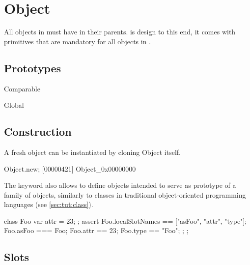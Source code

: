 
\section{Object}

All objects in \us must have  in their
parents.  is design to this end, it comes with primitives
that are mandatory for all objects in \us.

\subsection{Prototypes}

\begin{refObjects}
\item[Comparable]
\item[Global]
\end{refObjects}

\subsection{Construction}

A fresh object can be instantiated by cloning Object itself.

\begin{urbiscript}[firstnumber=1]
Object.new;
[00000421] Object_0x00000000
\end{urbiscript}

The keyword  also allows to define objects intended to serve
as prototype of a family of objects, similarly to classes in traditional
object-oriented programming languages (see \autoref{sec:tut:class}).

\begin{urbiscript}
{
  class Foo
  {
    var attr = 23;
  };
  assert
  {
    Foo.localSlotNames == ["asFoo", "attr", "type"];
    Foo.asFoo === Foo;
    Foo.attr == 23;
    Foo.type == "Foo";
  };
};
\end{urbiscript}


\subsection{Slots}


